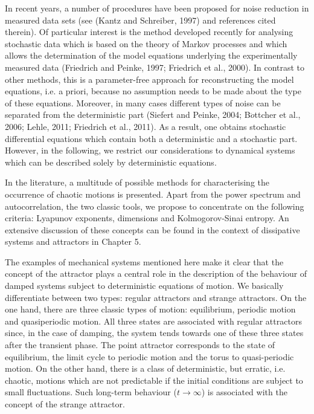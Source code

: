 \documentclass[12pt]{article}
\begin{document}
In recent years, a number of procedures have been proposed for noise reduction in
measured data sets (see (Kantz and Schreiber, 1997) and references cited therein).
Of particular interest is the method developed recently for analysing stochastic
data which is based on the theory of Markov processes and which allows the determination
of the model equations underlying the experimentally measured data
(Friedrich and Peinke, 1997; Friedrich et al., 2000). In contrast to other methods,
this is a parameter-free approach for reconstructing the model equations, i.e. a
priori, because no assumption needs to be made about the type of these equations.
Moreover, in many cases different types of noise can be separated from
the deterministic part (Siefert and Peinke, 2004; B$\ddot{o}$ttcher et al., 2006; Lehle, 2011;
Friedrich et al., 2011). As a result, one obtains stochastic differential equations
which contain both a deterministic and a stochastic part. However, in the following,
we restrict our considerations to dynamical systems which can be described solely
by deterministic equations.

\hfill

In the literature, a multitude of possible methods for characterising the occurrence
of chaotic motions is presented. Apart from the power spectrum and autocorrelation,
the two classic tools, we propose to concentrate on the following criteria:
Lyapunov exponents, dimensions and Kolmogorov-Sinai entropy. An extensive discussion
of these concepts can be found in the context of dissipative systems and
attractors in Chapter 5.

\hfill

The examples of mechanical systems mentioned here make it clear that the concept
of the attractor plays a central role in the description of the behaviour of damped
systems subject to deterministic equations of motion. We basically differentiate
between two types: regular attractors and strange attractors. On the one hand,
there are three classic types of motion: equilibrium, periodic motion and quasiperiodic
motion. All three states are associated with regular attractors since, in
the case of damping, the system tends towards one of these three states after the
transient phase. The point attractor corresponds to the state of equilibrium, the
limit cycle to periodic motion and the torus to quasi-periodic motion. On the other
hand, there is a class of deterministic, but erratic, i.e. chaotic, motions which are not
predictable if the initial conditions are subject to small fluctuations. Such long-term
behaviour ($t \to \infty$) is associated with the concept of the strange attractor.
\end{document}
